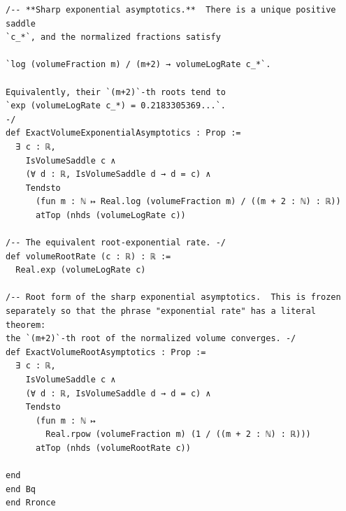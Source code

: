 \documentclass[11pt]{article}
\theoremstyle{definition}
\theoremstyle{remark}
\begin{document}
\begin{lstlisting}
/-- **Sharp exponential asymptotics.**  There is a unique positive saddle
`c_*`, and the normalized fractions satisfy

`log (volumeFraction m) / (m+2) → volumeLogRate c_*`.

Equivalently, their `(m+2)`-th roots tend to
`exp (volumeLogRate c_*) = 0.2183305369...`.
-/
def ExactVolumeExponentialAsymptotics : Prop :=
  ∃ c : ℝ,
    IsVolumeSaddle c ∧
    (∀ d : ℝ, IsVolumeSaddle d → d = c) ∧
    Tendsto
      (fun m : ℕ ↦ Real.log (volumeFraction m) / ((m + 2 : ℕ) : ℝ))
      atTop (nhds (volumeLogRate c))

/-- The equivalent root-exponential rate. -/
def volumeRootRate (c : ℝ) : ℝ :=
  Real.exp (volumeLogRate c)

/-- Root form of the sharp exponential asymptotics.  This is frozen
separately so that the phrase "exponential rate" has a literal theorem:
the `(m+2)`-th root of the normalized volume converges. -/
def ExactVolumeRootAsymptotics : Prop :=
  ∃ c : ℝ,
    IsVolumeSaddle c ∧
    (∀ d : ℝ, IsVolumeSaddle d → d = c) ∧
    Tendsto
      (fun m : ℕ ↦
        Real.rpow (volumeFraction m) (1 / ((m + 2 : ℕ) : ℝ)))
      atTop (nhds (volumeRootRate c))

end
end Bq
end Rronce
\end{lstlisting}
\end{document}
